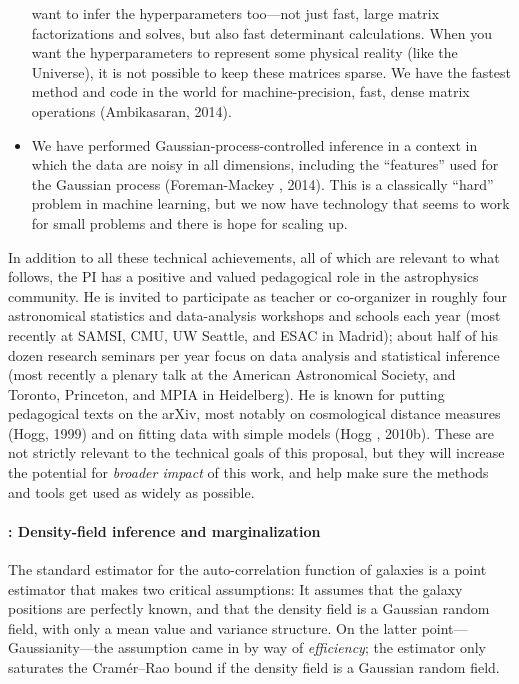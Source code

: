 \documentclass[12pt]{article}
\begin{document}
\begin{itemize}
want to infer the hyperparameters too---not just fast, large matrix
factorizations and solves, but also fast determinant calculations.
When you want the hyperparameters to represent some physical reality
(like the Universe), it is not possible to keep these matrices sparse.
We have the fastest method and code in the world for
machine-precision, fast, dense matrix operations (Ambikasaran, 2014).
\item
We have performed Gaussian-process-controlled inference in a context
in which the data are noisy in all dimensions, including the
``features'' used for the Gaussian process (Foreman-Mackey \etal,
2014).  This is a classically ``hard'' problem in machine learning,
but we now have technology that seems to work for small problems and
there is hope for scaling up.
\end{itemize}

In addition to all these technical achievements, all of which are
relevant to what follows, the PI has a positive and valued pedagogical
role in the astrophysics community.
He is invited to participate as teacher or co-organizer in roughly
four astronomical statistics and data-analysis workshops and schools
each year (most recently at SAMSI, CMU, UW Seattle, and ESAC in
Madrid); about half of his dozen research seminars per year focus on
data analysis and statistical inference (most recently a plenary talk
at the American Astronomical Society, and Toronto, Princeton, and MPIA
in Heidelberg).
He is known for putting pedagogical texts on the arXiv, most notably
on cosmological distance measures (Hogg, 1999) and on fitting data
with simple models (Hogg \etal, 2010b).
These are not strictly relevant to the technical goals of this proposal,
but they will increase the potential for \emph{broader impact} of this work, and
help make sure the methods and tools get used as widely as possible.

\paragraph{: Density-field inference and marginalization}

The standard estimator for the auto-correlation function of galaxies
is a point estimator that makes two critical assumptions:
It assumes that the galaxy positions are perfectly known, and that the
density field is a Gaussian random field, with only a mean value and
variance structure.
On the latter point---Gaussianity---the assumption came in by way of
\emph{efficiency}; the estimator only saturates the Cram\'er--Rao
bound if the density field is a Gaussian random field.
\end{document}

